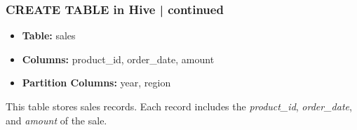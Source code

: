	\begin{frame}[fragile]
	\frametitle{CREATE TABLE in Hive | continued}
	\begin{tcolorbox}[colback=white,colframe=black,title= Part 5: Table Partitions]
		\small

	\begin{itemize}
	\item \textbf{Table:} sales
	\item \textbf{Columns:} product_id, order_date, amount
	\item \textbf{Partition Columns:} year, region
	\end{itemize}
	This table stores sales records. Each record includes the \textit{product\_id}, \textit{order\_date}, and \textit{amount} of the sale.
\end{tcolorbox}
	
\end{frame}
